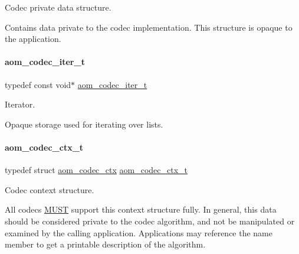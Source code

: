 Codec private data structure. 

Contains data private to the codec implementation. This structure is opaque to the application. \mbox{\label{group__codec_gadf9e173c9e02788a9999399edab20a02}} 
\paragraph{\texorpdfstring{aom\+\_\+codec\+\_\+iter\+\_\+t}{aom\_codec\_iter\_t}}
{\footnotesize\ttfamily typedef const void$\ast$ \hyperlink{group__codec_gadf9e173c9e02788a9999399edab20a02}{aom\+\_\+codec\+\_\+iter\+\_\+t}}



Iterator. 

Opaque storage used for iterating over lists. \mbox{\label{group__codec_ga9a1d27f9742d9f70783e3c6cb849b5b4}} 
\paragraph{\texorpdfstring{aom\+\_\+codec\+\_\+ctx\+\_\+t}{aom\_codec\_ctx\_t}}
{\footnotesize\ttfamily typedef struct \hyperlink{structaom__codec__ctx}{aom\+\_\+codec\+\_\+ctx}  \hyperlink{group__codec_ga9a1d27f9742d9f70783e3c6cb849b5b4}{aom\+\_\+codec\+\_\+ctx\+\_\+t}}



Codec context structure. 

All codecs \hyperlink{rfc2119_MUST}{M\+U\+ST} support this context structure fully. In general, this data should be considered private to the codec algorithm, and not be manipulated or examined by the calling application. Applications may reference the \textquotesingle{}name\textquotesingle{} member to get a printable description of the algorithm. \mbox{\label{group__codec_ga8d0bf39eb86f047f1b2f6f1efe05a3ae}} 

